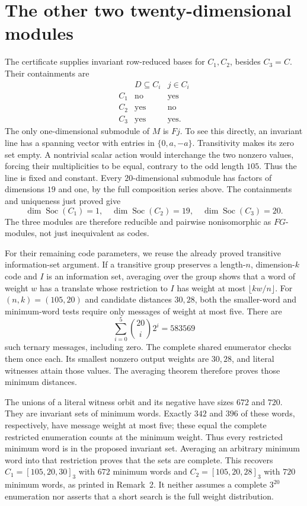 \documentclass[11pt,a4paper]{article}
\newcommand{\Soc}{\operatorname{Soc}}
\begin{document}
\section{The other two twenty-dimensional modules}
The certificate supplies invariant row-reduced bases for $C_1,C_2$,
besides $C_3=C$. Their containments are
\[
\begin{array}{c|cc}
 &D\subseteq C_i&j\in C_i\\\hline
C_1&\text{no}&\text{yes}\\
C_2&\text{yes}&\text{no}\\
C_3&\text{yes}&\text{yes}.
\end{array}
\]
The only one-dimensional submodule of $M$ is $Fj$. To see this directly,
an invariant line has a spanning vector with entries in $\{0,a,-a\}$.
Transitivity makes its zero set empty. A nontrivial scalar action would
interchange the two nonzero values, forcing their multiplicities to be
equal, contrary to the odd length $105$. Thus the line is fixed and
constant. Every $20$-dimensional submodule has factors of dimensions
$19$ and one, by the full composition series above. The containments
and uniqueness just proved give
\[
 \dim\Soc(C_1)=1,\quad \dim\Soc(C_2)=19,\quad
 \dim\Soc(C_3)=20.
\]
The three modules are therefore reducible and pairwise nonisomorphic
as $FG$-modules, not just inequivalent as codes.

For their remaining code parameters, we reuse the already proved
transitive information-set argument. If a transitive group preserves a
length-$n$, dimension-$k$ code and $I$ is an information set, averaging
over the group shows that a word of weight $w$ has a translate whose
restriction to $I$ has weight at most $\lfloor kw/n\rfloor$.
For $(n,k)=(105,20)$ and candidate distances $30,28$, both the smaller-word
and minimum-word tests require only messages of weight at most five.
There are
\[
 \sum_{i=0}^{5}\binom{20}{i}2^i=583569
\]
such ternary messages, including zero. The complete shared enumerator
checks them once each. Its smallest nonzero output weights are $30,28$,
and literal witnesses attain those values. The averaging theorem
therefore proves those minimum distances.

The unions of a literal witness orbit and its negative have sizes $672$
and $720$. They are invariant sets of minimum words. Exactly $342$ and
$396$ of these words, respectively, have message weight at most five;
these equal the complete restricted enumeration counts at the minimum
weight. Thus every restricted minimum word is in the proposed invariant
set. Averaging an arbitrary minimum word into that restriction proves
that the sets are complete. This recovers
$C_1=[105,20,30]_3$ with $672$ minimum words and
$C_2=[105,20,28]_3$ with $720$ minimum words, as printed in Remark~2.
It neither assumes a complete $3^{20}$ enumeration nor asserts that a
short search is the full weight distribution.
\end{document}
